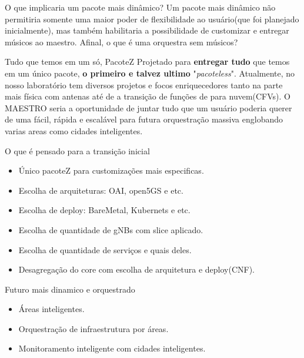 \documentclass[brazil]{beamer}
\begin{document}
\begin{frame}{O que implicaria um pacote mais dinâmico?}
    \hspace{0.5cm}Um pacote mais dinâmico não permitiria somente uma maior poder de flexibilidade ao 
    usuário(que foi planejado inicialmente), mas também habilitaria a possibilidade de customizar 
    e entregar músicos ao maestro. Afinal, o que é uma orquestra sem músicos?
\end{frame}

\begin{frame}{Tudo que temos em um só, PacoteZ}
    \hspace{0.5cm}Projetado para \textbf{entregar tudo} que temos em um único pacote, \textbf{o primeiro  e 
    talvez ultimo} "\textit{pacoteless}". Atualmente, no nosso laboratório tem diversos projetos e focos enriquecedores 
    tanto na parte mais física com antenas até de a transição de funções de para nuvem(CFVs). O MAESTRO seria a 
    oportunidade de juntar tudo que um usuário poderia querer de uma fácil, rápida e escalável para futura 
    orquestração massiva englobando varias areas como cidades inteligentes.
\end{frame}

\begin{frame}{O que é pensado para a transição inicial}
    \begin{itemize}
        \item Único pacoteZ para customizações mais especificas.
        \item Escolha de arquiteturas: OAI, open5GS e etc.
        \item Escolha de deploy: BareMetal, Kubernets e etc.
        \item Escolha de quantidade de gNBs com slice aplicado.
        \item Escolha de quantidade de serviços e quais deles.
        \item Desagregação do core com escolha de arquitetura e deploy(CNF).
    \end{itemize}
\end{frame}

\begin{frame}{Futuro mais dinamico e orquestrado}
    \begin{itemize}
        \item Áreas inteligentes.
        \item Orquestração de infraestrutura por áreas.
        \item Monitoramento inteligente com cidades inteligentes.
    \end{itemize}
\end{frame}
\end{document}
